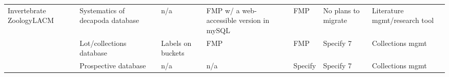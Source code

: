 \begin{table}[h]
{\begin{tabular}{lllllll}
\multirow{3}{*}{Invertebrate ZoologyLACM}                & Systematics of decapoda database             & n/a                      & FMP w/ a web-accessible version in mySQL & FMP                                  & No plans to migrate         & Literature mgmt/research tool               \\
                                                         & Lot/collections database                     & Labels on buckets        & FMP                                      & FMP                                  & Specify 7                   & Collections mgmt                            \\
                                                         & Prospective database                         & n/a                      & n/a                                      & Specify                              & Specify 7                   & Collections mgmt                           
\end{tabular}
}
\end{table}
